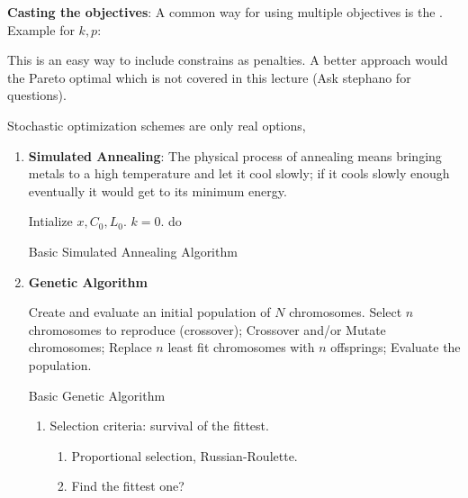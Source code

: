 \documentclass{school-22.211-notes}
\begin{document}
\clearpage
{}

\textbf{Casting the objectives}: A common way for using multiple objectives is
the . Example for $k, p$: 


This is an easy way to include constrains as penalties. A better
approach would the Pareto optimal which is not covered in this lecture
(Ask stephano for questions).


Stochastic optimization schemes are only real options, 

\begin{enumerate}
\item \textbf{Simulated Annealing}: The physical process of annealing
  means bringing metals to a high temperature and let it cool slowly;
  if it cools slowly enough eventually it would get to its minimum
  energy.

\begin{algorithm}
  \begin{algorithmic}
    \STATE Intialize $x, C_0, L_0$.  $k=0$. 
    \STATE do 
    \ENDWHILE
  \end{algorithmic}
  \caption{Basic Simulated Annealing Algorithm} 
\end{algorithm}

\item \textbf{Genetic Algorithm}
  \begin{algorithm}
    \begin{algorithmic}
      \STATE Create and evaluate an initial population of $N$ chromosomes.
      \STATE Select $n$ chromosomes to reproduce (crossover); 
      \STATE Crossover and/or Mutate chromosomes;
      \STATE Replace $n$ least fit chromosomes with $n$ offsprings;
      \STATE Evaluate the population.
      \ENDWHILE
    \end{algorithmic}
    \caption{Basic Genetic Algorithm}
  \end{algorithm}

  \begin{enumerate}
  \item  Selection criteria: survival of the fittest. 
    \begin{enumerate}
    \item Proportional selection, Russian-Roulette. 
    \item Find the fittest one? 
    \end{enumerate}


\end{enumerate}
\end{enumerate}
\end{document}
